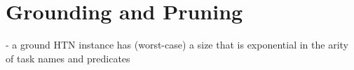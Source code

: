 \section{Grounding and Pruning}
\cite{holler2014language}
- a ground HTN instance has (worst-case) a size that is exponential in the arity of task names and predicates
